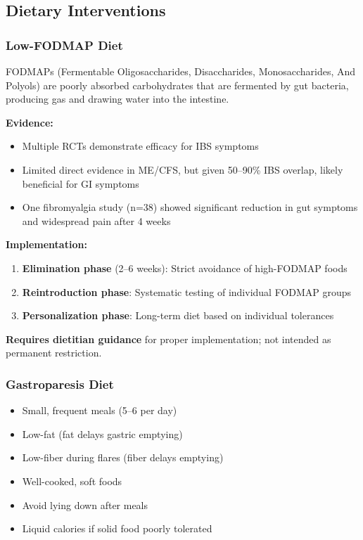 \subsection{Dietary Interventions}

\subsubsection{Low-FODMAP Diet}

FODMAPs (Fermentable Oligosaccharides, Disaccharides, Monosaccharides, And Polyols) are poorly absorbed carbohydrates that are fermented by gut bacteria, producing gas and drawing water into the intestine.

\textbf{Evidence:}
\begin{itemize}
    \item Multiple RCTs demonstrate efficacy for IBS symptoms
    \item Limited direct evidence in ME/CFS, but given 50--90\% IBS overlap, likely beneficial for GI symptoms
    \item One fibromyalgia study (n=38) showed significant reduction in gut symptoms and widespread pain after 4 weeks
\end{itemize}

\textbf{Implementation:}
\begin{enumerate}
    \item \textbf{Elimination phase} (2--6 weeks): Strict avoidance of high-FODMAP foods
    \item \textbf{Reintroduction phase}: Systematic testing of individual FODMAP groups
    \item \textbf{Personalization phase}: Long-term diet based on individual tolerances
\end{enumerate}

\textbf{Requires dietitian guidance} for proper implementation; not intended as permanent restriction.

\subsubsection{Gastroparesis Diet}

\begin{itemize}
    \item Small, frequent meals (5--6 per day)
    \item Low-fat (fat delays gastric emptying)
    \item Low-fiber during flares (fiber delays emptying)
    \item Well-cooked, soft foods
    \item Avoid lying down after meals
    \item Liquid calories if solid food poorly tolerated
\end{itemize}

